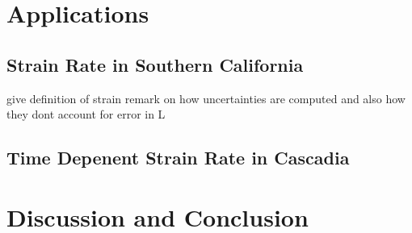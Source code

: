 \documentclass[10pt,a4paper]{article}
\begin{document}
\section{Applications}\label{sec:Applications}

\subsection{Strain Rate in Southern California}\label{sec:ApplicationsSoCal}
give definition of strain
remark on how uncertainties are computed and also how they dont account for error in L

\subsection{Time Depenent Strain Rate in Cascadia}\label{sec:ApplicationsCascadia}

\section{Discussion and Conclusion}\label{sec:Discussion}



  
 
\end{document}
